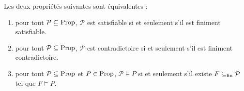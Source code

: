\begin{proposition}
  Les deux propriétés suivantes sont équivalentes :
  \begin{enumerate}[label=(\roman*)]
  \item\label{enum.compac.prop1} pour tout $\mathcal P\subseteq \operatorname{Prop}$,
    $\mathcal P$ est satisfiable si et seulement s'il est finiment satisfiable.
  \item\label{enum.compac.prop2} pour tout $\mathcal P\subseteq\operatorname{Prop}$,
    $\mathcal P$ est contradictoire si et seulement s'il est finiment
    contradictoire.
  \item\label{enum.compac.prop3} pour tout $\mathcal P\subseteq\operatorname{Prop}$ et
    $P\in\operatorname{Prop}$, $\mathcal P\vDash P$ si et seulement s'il existe
    $F\subseteq_{\mathrm{fin}} \mathcal P$ tel que $F\vDash P$.
  \end{enumerate}
\end{proposition}

